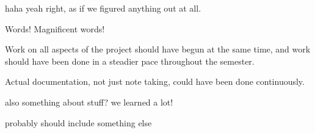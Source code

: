 haha yeah right, as if we figured anything out at all.



Words! Magnificent words!



Work on all aspects of the project should have begun at the same time, and work should have been done in a steadier pace throughout the semester.

Actual documentation, not just note taking, could have been done continuously.


also something about stuff?
we learned a lot!

probably should include something else

